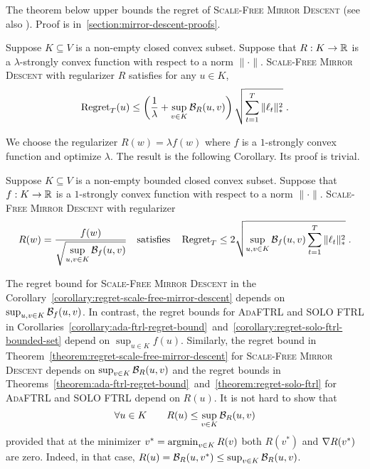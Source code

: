 The theorem below upper bounds the regret of \textsc{Scale-Free Mirror Descent}
(see also
\cite{Duchi-Hazan-Singer-2011,Duchi-Shalev-Shwartz-Singer-Tewari-2010,Rakhlin-Sridharan-2013}).
Proof is in~\ref{section:mirror-descent-proofs}.

\begin{theorem}
\label{theorem:regret-scale-free-mirror-descent}
Suppose $K \subseteq V$ is a non-empty closed convex subset. Suppose that $R:K
\to \mathbb{R}$ is a $\lambda$-strongly convex function with respect to a norm
$\|\cdot\|$.  \textsc{Scale-Free Mirror Descent} with regularizer $R$ satisfies
for any $u \in K$,
$$
\operatorname{Regret}_T(u)
\le
\left( \frac{1}{\lambda} + \sup_{v \in K} \mathcal{B}_R(u,v) \right) \sqrt{\sum_{t=1}^T \|\ell_t\|_*^2} \; .
$$
\end{theorem}

We choose the regularizer $R(w) = \lambda f(w)$ where $f$ is a $1$-strongly convex
function and optimize $\lambda$. The result is the following Corollary. Its
proof is trivial.

\begin{corollary}
\label{corollary:regret-scale-free-mirror-descent}
Suppose $K \subseteq V$ is a non-empty bounded closed convex subset.  Suppose
that $f:K \to \mathbb{R}$ is a $1$-strongly convex function with respect to a norm
$\|\cdot\|$.  \textsc{Scale-Free Mirror Descent} with regularizer
$$
R(w) = \frac{f(w)}{\displaystyle \sqrt{\sup_{u,v \in K} \Breg_f(u,v)}}
\quad \text{satisfies} \quad %
\Regret_T \le 2 \sqrt{\sup_{u,v \in K} \Breg_f(u,v) \sum_{t=1}^T \|\ell_t\|_*^2} \; .
$$
\end{corollary}

The regret bound for \textsc{Scale-Free Mirror Descent} in the
Corollary~\ref{corollary:regret-scale-free-mirror-descent} depends on
$\sup_{u,v \in K} \mathcal{B}_f(u,v)$. In contrast, the regret bounds for
\textsc{AdaFTRL} and \textsc{SOLO FTRL} in
Corollaries~\ref{corollary:ada-ftrl-regret-bound}~and~\ref{corollary:regret-solo-ftrl-bounded-set}
depend on $\sup_{u \in K} f(u)$.  Similarly, the regret bound in
Theorem~\ref{theorem:regret-scale-free-mirror-descent} for \textsc{Scale-Free
Mirror Descent} depends on $\sup_{v \in K} \mathcal{B}_R(u,v)$ and the regret bounds in
Theorems~\ref{theorem:ada-ftrl-regret-bound}~and~\ref{theorem:regret-solo-ftrl}
for \textsc{AdaFTRL} and \textsc{SOLO FTRL} depend on $R(u)$. It is not hard to
show that
\begin{equation}
\label{equation:regularizer-vs-divergence}
\forall u \in K \qquad R(u) \le \sup_{v \in K} \mathcal{B}_R(u,v)
\end{equation}
provided that at the minimizer $v^* = \operatorname*{argmin}_{v \in K} R(v)$ both $R(v^*)$ and
$\nabla R(v^*)$ are zero. Indeed, in that case, $R(u) = \mathcal{B}_R(u,v^*) \le
\sup_{v \in K} \mathcal{B}_R(u,v)$.


